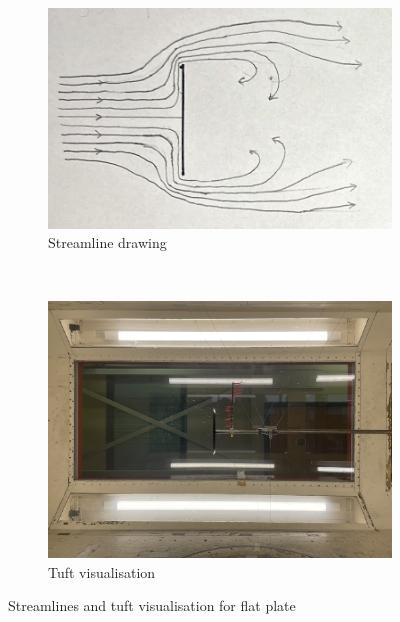 \documentclass[8pt]{article}
\begin{document}
\begin{figure}[H]
    \centering
    \begin{subfigure}[t]{0.48\textwidth}
        \centering
        \includegraphics[width=1\textwidth]{Images_Videos/stream_flat_plate_1.jpg}
        \caption{Streamline drawing}
        \label{fig:figure4}
    \end{subfigure}
    ~
    \begin{subfigure}[t]{0.48\textwidth}
        \centering
        \includegraphics[width=1\textwidth]{Images_Videos/Plate_8milibar.jpg}
        \caption{Tuft visualisation}
        \label{fig:figure5}
    \end{subfigure}
    \caption{Streamlines and tuft visualisation for flat plate}
\end{figure}
\end{document}
